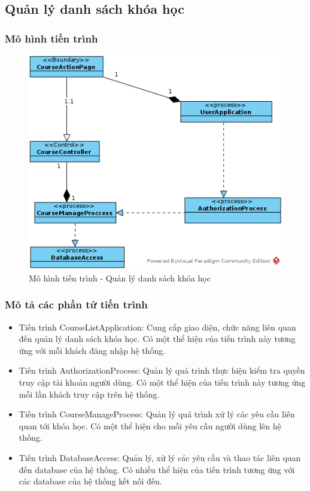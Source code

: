 \documentclass[./../main.tex]{subfiles}
\begin{document}
\subsection{Quản lý danh sách khóa học}

\subsubsection{Mô hình tiến trình}

\begin{figure}[H]
	\centering
	\includegraphics[width=\linewidth]{./images/pv_course_manage.png}
\caption{Mô hình tiến trình - Quản lý danh sách khóa học}

\end{figure}

\subsubsection{Mô tả các phần tử tiến trình}
\begin{itemize}
	\item Tiến trình CourseListApplication: Cung cấp giao diện, chức năng liên quan đến quản lý danh sách khóa học. Có một thể hiện của tiến trình này tương ứng với mỗi khách đăng nhập hệ thống.
	\item Tiến trình AuthorizationProcess: Quản lý quá trình thực hiện kiểm tra quyền truy cập tài khoản người dùng.
	Có một thể hiện của tiến trình này tương ứng mỗi lần khách truy cập trên hệ thống.
\item Tiến trình CourseManageProcess: Quản lý quá trình xử lý các yêu cầu liên quan tới khóa học.
	Có một thể hiện cho mỗi yêu cầu người dùng lên hệ thống.
	\item Tiến trình DatabaseAccess: Quản lý, xử lý các yêu cầu và thao tác liên quan đến database của hệ thống. Có nhiều thể hiện của tiến trình tương ứng với các database của hệ thống kết nối đến.
\end{itemize}

\clearpage
\end{document}
